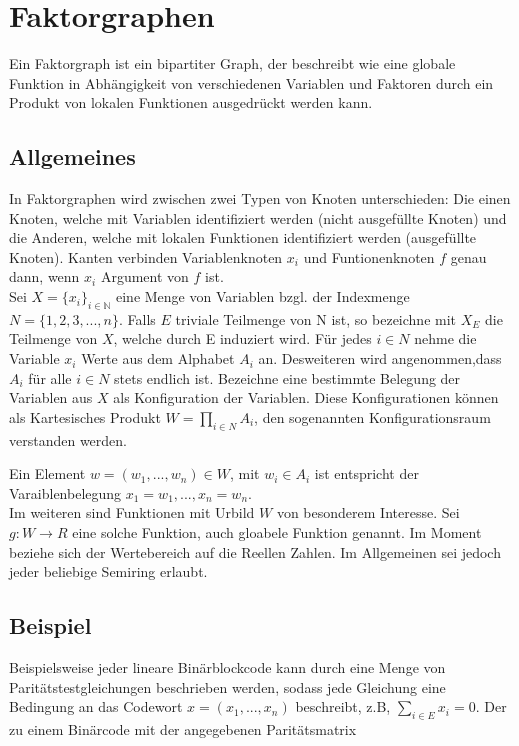 \documentclass[12pt,a4paper]{scrartcl}
\numberwithin{equation}{section}
\newcommand{\N}{\mathbb{N}} %
\begin{document}
\section{Faktorgraphen}
Ein Faktorgraph ist ein bipartiter Graph, der beschreibt wie eine globale Funktion in Abhängigkeit von 
verschiedenen Variablen und Faktoren durch ein Produkt von lokalen Funktionen ausgedrückt werden kann.

\subsection{Allgemeines}
In Faktorgraphen wird zwischen zwei Typen von Knoten unterschieden: Die einen Knoten, welche mit Variablen 
identifiziert werden (nicht ausgefüllte Knoten) und die Anderen, welche mit lokalen Funktionen identifiziert werden 
(ausgefüllte Knoten).  Kanten verbinden Variablenknoten $x_{i}$ und Funtionenknoten $f$ genau dann, wenn 
$x_{i}$ Argument von $f$ ist. \\

Sei $X = \{ x_{i} \}_{i \in \N}$ eine Menge von Variablen bzgl. der Indexmenge $N = \{ 1,2,3,...,n \}$. 
Falls $E$ triviale Teilmenge von N ist, so bezeichne mit $X_{E}$ die Teilmenge von $X$, welche durch E induziert wird. 
Für jedes $ i \in N $ nehme die Variable $x_{i}$ Werte aus dem Alphabet $A_{i}$ an. Desweiteren wird angenommen,dass
$A_{i}$ für alle $i \in N$ stets endlich ist. Bezeichne eine bestimmte Belegung der Variablen aus $X$ als Konfiguration 
der Variablen. Diese Konfigurationen können als Kartesisches Produkt $W = \prod_{i \in N}A_{i}$, den sogenannten Konfigurationsraum
verstanden werden. 

Ein Element $w = (w_{1},...,w_{n}) \in W$, mit $w_{i} \in A_{i}$ ist entspricht der Varaiblenbelegung
$x_{1} = w_{1},...,x_{n} = w_{n} $. \\

Im weiteren sind Funktionen mit Urbild $W$ von besonderem Interesse. Sei $g: W \rightarrow R$ eine solche Funktion, auch gloabele
Funktion genannt. Im Moment beziehe sich der Wertebereich auf die Reellen Zahlen. Im Allgemeinen sei jedoch jeder beliebige Semiring erlaubt. \\

\subsection{Beispiel}

Beispielsweise jeder lineare Binärblockcode kann durch eine Menge von Paritätstestgleichungen beschrieben werden, sodass jede
Gleichung eine Bedingung an das Codewort $x = (x_1,...,x_n)$ beschreibt, z.B, $\sum_{i \in E} x_i = 0$. 
Der zu einem Binärcode mit der angegebenen Paritätsmatrix  
\end{document}
